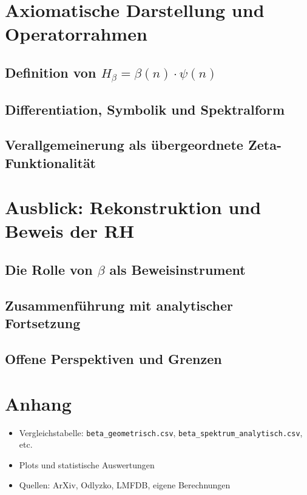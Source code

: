 \documentclass[12pt]{article}
\begin{document}
\section{Axiomatische Darstellung und Operatorrahmen}
\subsection{Definition von \(H_\beta = \beta(n) \cdot \psi(n)\)}
\subsection{Differentiation, Symbolik und Spektralform}
\subsection{Verallgemeinerung als übergeordnete Zeta-Funktionalität}

\section{Ausblick: Rekonstruktion und Beweis der RH}
\subsection{Die Rolle von \(\beta\) als Beweisinstrument}
\subsection{Zusammenführung mit analytischer Fortsetzung}
\subsection{Offene Perspektiven und Grenzen}

\section{Anhang}
\begin{itemize}
    \item Vergleichstabelle: \texttt{beta\_geometrisch.csv}, \texttt{beta\_spektrum\_analytisch.csv}, etc.
    \item Plots und statistische Auswertungen
    \item Quellen: ArXiv, Odlyzko, LMFDB, eigene Berechnungen
\end{itemize}
\end{document}

